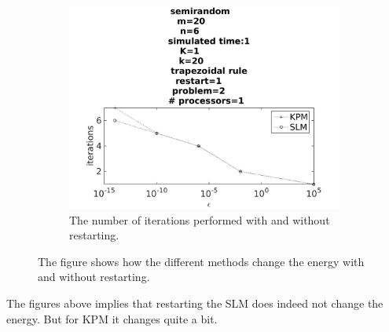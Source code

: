 \begin{figure}[H]
\begin{subfigure}[b]{0.3\textwidth}
                \includegraphics[width=\textwidth]{../MATLAB/fig/compareIter2.jpg}
                \caption{ The number of iterations performed with and without restarting.  }
                \label{fig:compareIter}
        \end{subfigure}
        \caption{ The figure shows how the different methods change the energy with and without restarting.  }
        \label{fig:compare}
\end{figure}

The figures above implies that restarting the SLM does indeed not change the energy. But for KPM it changes quite a bit. 


